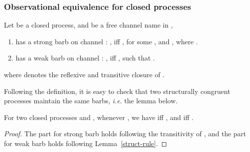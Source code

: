 \documentclass{LMCS}
\makeatletter
\newcommand{\forget}[1]{}
\newcommand{\ie}{\emph{i.e.}\@\xspace}
\renewcommand{\_}{\mathord{\rule[-.25ex]{1ex}{.15ex}}}
\makeatother
\begin{document}
\subsubsection{Observational equivalence for closed processes}
\begin{defi}
  Let  be a closed process, and  be a free channel name in ,
  \begin{enumerate}[(1)]
  \item  has a strong barb on channel : , iff , for some ,  and
    , where .
  \item  has a weak barb on channel : , iff , such that .
  \end{enumerate}
  where  denotes the reflexive and
  transitive closure of .
\end{defi}
Following the definition, it is easy to check that two structurally
congruent processes maintain the same barbs, \ie the lemma below.
\begin{lem}\label{lemma.barb}
  For two closed processes  and , whenever , we have
   iff , and  iff
  .
\end{lem}
\begin{proof}
  The part for strong barb holds following the transitivity of
  , and the part for weak barb holds following
  Lemma~\ref{struct-rule}.  \forget{\qed}
\end{proof}
\end{document}

